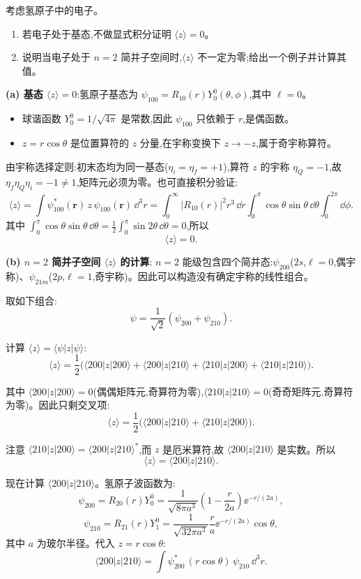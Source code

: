 \begin{question}
考虑氢原子中的电子。
\begin{enumerate}
\item 若电子处于基态,不做显式积分证明 $\langle z\rangle=0$。
\item 说明当电子处于 $n=2$ 简并子空间时,$\langle z\rangle$ 不一定为零;给出一个例子并计算其值。
\end{enumerate}
\begin{solution}
	\textbf{(a) 基态 $\langle z\rangle=0$}:氢原子基态为 $\psi_{100}=R_{10}(r)Y_0^0(\theta,\phi)$,其中 $\ell=0$。
	\begin{itemize}
	\item 球谐函数 $Y_0^0=1/\sqrt{4\pi}$ 是常数,因此 $\psi_{100}$ 只依赖于 $r$,是偶函数。
	\item $z=r\cos\theta$ 是位置算符的 $z$ 分量,在宇称变换下 $z\to -z$,属于奇宇称算符。
	\end{itemize}

	由宇称选择定则:初末态均为同一基态($\eta_i=\eta_f=+1$),算符 $z$ 的宇称 $\eta_Q=-1$,故 $\eta_f\eta_Q\eta_i=-1\neq1$,矩阵元必须为零。也可直接积分验证:
	\[
	\langle z\rangle = \int \psi_{100}^*(\mathbf r)\,z\,\psi_{100}(\mathbf r)\,\dd^3 r
	= \int_0^\infty |R_{10}(r)|^2 r^3\,\dd r\int_0^\pi \cos\theta\sin\theta\,\dd\theta\int_0^{2\pi}\dd\phi.
	\]
	其中 $\int_0^\pi\cos\theta\sin\theta\,\dd\theta = \frac12\int_0^\pi\sin2\theta\,\dd\theta=0$,所以
	\[
	\boxed{\langle z\rangle = 0}.
	\]

	\textbf{(b) $n=2$ 简并子空间 $\langle z\rangle$ 的计算}:
	$n=2$ 能级包含四个简并态:$\psi_{200}$($2s$,$\ell=0$,偶宇称)、$\psi_{21m}$($2p$,$\ell=1$,奇宇称)。因此可以构造没有确定宇称的线性组合。

	取如下组合:
	\[
	\psi = \frac{1}{\sqrt{2}}(\psi_{200}+\psi_{210}).
	\]

	计算 $\langle z\rangle = \langle\psi|z|\psi\rangle$:
	\[
	\langle z\rangle = \frac12\Big(\langle200|z|200\rangle + \langle200|z|210\rangle + \langle210|z|200\rangle + \langle210|z|210\rangle\Big).
	\]

	其中 $\langle200|z|200\rangle=0$(偶偶矩阵元,奇算符为零),$\langle210|z|210\rangle=0$(奇奇矩阵元,奇算符为零)。因此只剩交叉项:
	\[
	\langle z\rangle = \frac12\Big(\langle200|z|210\rangle + \langle210|z|200\rangle\Big).
	\]

	注意 $\langle210|z|200\rangle = \langle200|z|210\rangle^*$,而 $z$ 是厄米算符,故 $\langle200|z|210\rangle$ 是实数。所以
	\[
	\langle z\rangle = \langle200|z|210\rangle.
	\]

	现在计算 $\langle200|z|210\rangle$。氢原子波函数为:
	\[
	\psi_{200} = R_{20}(r)Y_0^0 = \frac{1}{\sqrt{8\pi a^3}}\left(1-\frac{r}{2a}\right)\ee^{-r/(2a)},
	\]
	\[
	\psi_{210} = R_{21}(r)Y_1^0 = \frac{1}{\sqrt{32\pi a^3}}\frac{r}{a}\ee^{-r/(2a)}\cos\theta,
	\]
	其中 $a$ 为玻尔半径。代入 $z=r\cos\theta$:
	\[
	\langle200|z|210\rangle = \int \psi_{200}^*\,(r\cos\theta)\,\psi_{210}\,\dd^3 r.
	\]


\end{solution}
\end{question}
